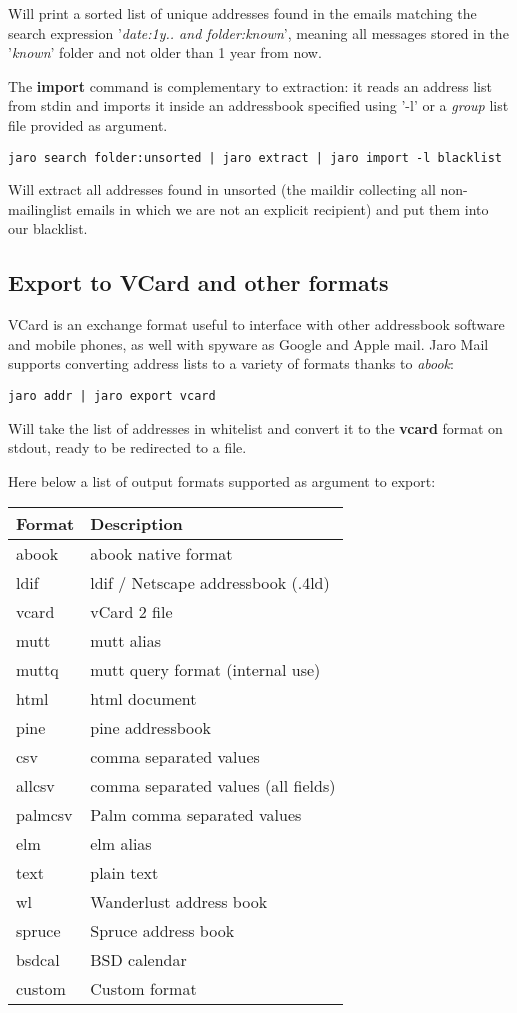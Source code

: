 \documentclass[a4,onecolumn,portrait]{article}
\begin{document}
Will print a sorted list of unique addresses found in the emails matching the search expression '\emph{date:1y.. and folder:known}', meaning all messages stored in the '\emph{known}' folder and not older than 1 year from now.

The \textbf{import} command is complementary to extraction: it reads an address list from stdin and imports it inside an addressbook specified using '-l' or a \emph{group} list file provided as argument.

\begin{verbatim}
jaro search folder:unsorted | jaro extract | jaro import -l blacklist
\end{verbatim}

Will extract all addresses found in unsorted (the maildir collecting all non-mailinglist emails in which we are not an explicit recipient) and put them into our blacklist.
\subsection{Export to VCard and other formats}
\label{sec-9-2}

VCard is an exchange format useful to interface with other addressbook software and mobile phones, as well with spyware as Google and Apple mail. Jaro Mail supports converting address lists to a variety of formats thanks to \emph{abook}:

\begin{verbatim}
jaro addr | jaro export vcard
\end{verbatim}

Will take the list of addresses in whitelist and convert it to the \textbf{vcard} format on stdout, ready to be redirected to a file.

Here below a list of output formats supported as argument to export:

\begin{center}
\begin{tabular}{ll}
Format & Description\\
\hline
abook & abook native format\\
ldif & ldif / Netscape addressbook (.4ld)\\
vcard & vCard 2 file\\
mutt & mutt alias\\
muttq & mutt query format (internal use)\\
html & html document\\
pine & pine addressbook\\
csv & comma separated values\\
allcsv & comma separated values (all fields)\\
palmcsv & Palm comma separated values\\
elm & elm alias\\
text & plain text\\
wl & Wanderlust address book\\
spruce & Spruce address book\\
bsdcal & BSD calendar\\
custom & Custom format\\
\end{tabular}
\end{center}
\end{document}
